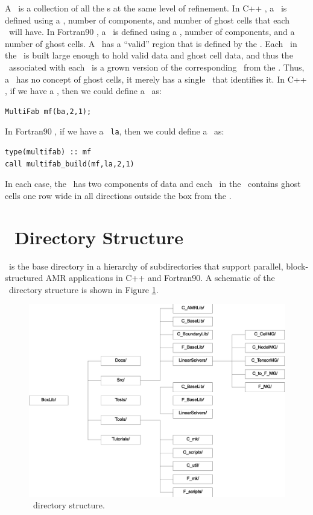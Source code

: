 A \MultiFab\ is a collection of all the \Fab s at the same level of
refinement.  In C++ \BoxLib, a \MultiFab\ is defined using a \BoxArray,
number of components, and number of ghost cells that each \Fab\
will have.  In Fortran90 \BoxLib, a \MultiFab\ is defined using a \Layout,
number of components, and a number of ghost cells.
A \MultiFab\ has a ``valid'' region that is defined by 
the \BoxArray.  Each \Fab\ in the \MultiFab\ is built large enough 
to hold valid data and ghost cell data, and thus the \BoxType\ associated with
each \Fab\ is a grown version of the corresponding \BoxType\ from the \BoxArray.
Thus, a \Fab\ has no concept 
of ghost cells, it merely has a single \BoxType\ that identifies it.  
In C++ \BoxLib, if we have a \BoxArray {\tt ba}, then we could define a 
\MultiFab\ as:
\begin{lstlisting}[language={[gnu]make},mathescape=false]
MultiFab mf(ba,2,1);
\end{lstlisting}
In Fortran90 \BoxLib, if we have a \Layout\ {\tt la}, then we could define
a \MultiFab\ as:
\begin{lstlisting}[language={[gnu]make},mathescape=false]
type(multifab) :: mf
call multifab_build(mf,la,2,1)
\end{lstlisting}
In each case, the \MultiFab\ has two components of data and each \Fab\ in the \MultiFab\ contains 
ghost cells one row wide in all directions outside the box from the \BoxArray.

\section{\BoxLib\ Directory Structure}

\BoxLib\ is the base directory in a hierarchy of subdirectories that
support parallel, block-structured AMR applications in C++ and Fortran90.
A schematic of the \BoxLib\ directory structure is shown in Figure 
\ref{fig:boxlib_directory}.
\begin{figure}[tb]
\centering
\includegraphics[width=6.5in]{./Introduction/boxlib_directory_bw2}
\caption{\label{fig:boxlib_directory}\BoxLib\ directory structure.}
\end{figure}

